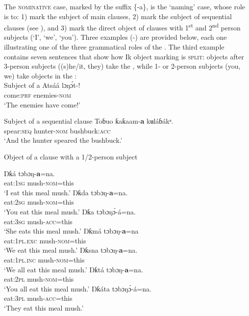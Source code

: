The \textsc{nominative} case, marked by the suffix \{-a\}, is the ‘naming’ case, whose role is to: 1) mark the subject of main clauses, 2) mark the subject of sequential clauses (see ), and 3) mark the direct object of clauses with 1\textsuperscript{st} and 2\textsuperscript{nd} person subjects (‘I’, ‘we’, ‘you’). Three examples (-) are provided below, each one illustrating one of the three grammatical roles of the . The third example contains seven sentences that show how Ik object marking is \textsc{split}: objects after 3-person subjects ((s)he/it, they) take the , while 1- or 2-person subjects (you, we) take objects in the :\\




Subject of a 
\ea\label{ex:case:9}
\gll Atsáá   lɔŋ\'{ɔ}t-\textbf{\ᵃ}! \\
come:\textsc{prf}   enemies-\textsc{nom}    \\
\glt ‘The enemies have come!’ 
\z




Subject of a sequential clause
\ea\label{ex:case:10}
\gll Toɓuo   ƙaƙaam-\textbf{a}   kʉláɓákᵃ. \\
spear:\textsc{seq}   hunter-\textsc{nom}   bushbuck:\textsc{acc}    \\
\glt ‘And the hunter speared the bushbuck.’ 
\z




Object of a clause with a 1/2-person subject




\ea\label{ex:case:11}
  \ea
  \gll Ŋƙ{\Í}á   tɔbɔŋ-\textbf{a}=na. \\
eat:\textsc{1sg}   mush-\textsc{nom}=this    \\   
  \glt ‘I eat this meal mush.’
  \ex
  \gll Ŋƙ{\Í}da   tɔbɔŋ-\textbf{a}=na. \\
eat:\textsc{2sg}   mush-\textsc{nom}=this    \\
  \glt ‘You eat this meal mush.’
  \ex
  \gll Ŋƙa   tɔbɔŋ\'{ɔ}-á=na. \\
eat:\textsc{3sg}   mush-\textsc{acc}=this    \\
  \glt ‘She eats this meal mush.’
  \ex
  \gll Ŋƙ{\Í}má     tɔbɔŋ-\textbf{a}=na \\
eat:\textsc{1pl.exc}   mush-\textsc{nom}=this    \\
  \glt ‘We eat this meal mush.’
  \ex
  \gll Ŋƙ{\Í}s{\Í}na     tɔbɔŋ-\textbf{a}=na. \\
eat:\textsc{1pl.inc}   mush-\textsc{nom}=this    \\
  \glt ‘We all eat this meal mush.’
  \ex
  \gll Ŋƙ{\Í}tá   tɔbɔŋ-\textbf{a}=na. \\
eat:\textsc{2pl}   mush-\textsc{nom}=this    \\
  \glt ‘You all eat this meal mush.’
  \ex
  \gll Ŋƙáta   tɔbɔŋ\'{ɔ}-á=na. \\
  eat:\textsc{3pl}   mush-\textsc{acc}=this    \\
  \glt ‘They eat this meal mush.’

